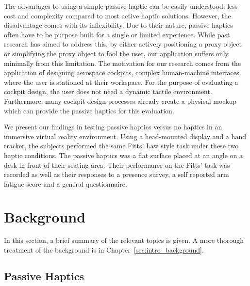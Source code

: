 The advantages to using a simple passive haptic can be easily understood: less cost and complexity compared to most active haptic solutions.
However, the disadvantage comes with its inflexibility.
Due to their nature, passive haptics often have to be purpose built for a single or limited experience.
While past research has aimed to address this, by either actively positioning a proxy object or simplifying the proxy object to fool the user, our application suffers only minimally from this limitation.
The motivation for our research comes from the application of designing aerospace cockpits, complex human-machine interfaces where the user is stationed at their workspace.
For the purpose of evaluating a cockpit design, the user does not need a dynamic tactile environment.
Furthermore, many cockpit design processes already create a physical mockup which can provide the passive haptics for this evaluation.

We present our findings in testing passive haptics versus no haptics in an immersive virtual reality environment.
Using a head-mounted display and a hand tracker, the subjects performed the same Fitts' Law style task under these two haptic conditions.
The passive haptics was a flat surface placed at an angle on a desk in front of their seating area.
Their performance on the Fitts' task was recorded as well as their responses to a presence survey, a self reported arm fatigue score and a general questionnaire.

\section{Background}

In this section, a brief summary of the relevant topics is given.
A more thorough treatment of the background is in Chapter~\ref{sec:intro_background}.

\subsection{Passive Haptics}

